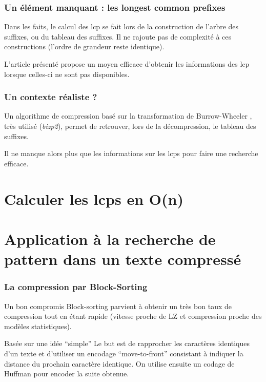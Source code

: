 \documentclass[10pt]{beamer}
\begin{document}
\begin{frame}
  \frametitle{Un élément manquant : les longest common prefixes}
  Dans les faits, le calcul des lcp se fait lors de la construction de
  l'arbre des suffixes, ou du tableau des suffixes. Il ne rajoute pas
  de complexité à ces constructions (l'ordre de grandeur reste
  identique).

  L'article présenté propose un moyen efficace d'obtenir
  les informations des lcp lorsque celles-ci ne sont pas
  disponibles\cite{Kasai01}.
\end{frame}


\begin{frame}
  \frametitle{Un contexte réaliste ?}
  Un algorithme de compression basé sur la transformation de
  Burrow-Wheeler \cite{Burrows94}, très utilisé (\emph{bizp2}), permet
  de retrouver, lors de la décompression, le tableau des suffixes. 

  Il ne manque alors plus que les informations sur les lcps pour faire
  une recherche efficace. 
\end{frame}

\section{Calculer les lcps en O(n)}
\label{sec:algo}



\section{Application à la recherche de pattern dans un texte compressé}
\label{sec:appcompress}

\begin{frame}
  \frametitle{La compression par Block-Sorting}

  \begin{block}{Un bon compromis}
    Block-sorting parvient à obtenir un très bon taux de compression
    tout en étant rapide (vitesse proche de LZ et compression proche
    des modèles statistiques\cite{Burrows94}).
  \end{block}

  \begin{block}{Basée sur une idée ``simple''}
    Le but est de rapprocher les caractères identiques d'un texte et
    d'utiliser un encodage ``move-to-front'' consistant à indiquer la
    distance du prochain caractère identique. On utilise ensuite un
    codage de Huffman pour encoder la suite obtenue.
  \end{block}


\end{frame}
\end{document}
